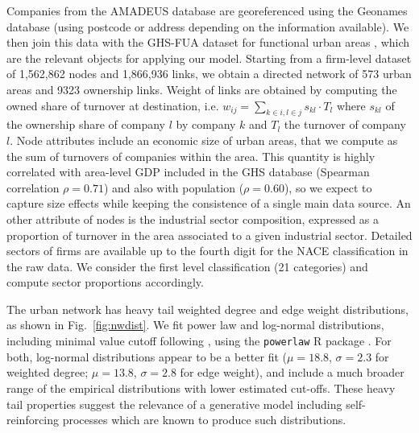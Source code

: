 \documentclass[11pt]{article}
\begin{document}

Companies from the AMADEUS database are georeferenced using the Geonames database (using postcode or address depending on the information available). We then join this data with the GHS-FUA dataset for functional urban areas \cite{Florczyk2019ghs}, which are the relevant objects for applying our model. Starting from a firm-level dataset of 1,562,862 nodes and  1,866,936 links, we obtain a directed network of 573 urban areas and 9323 ownership links. Weight of links are obtained by computing the owned share of turnover at destination, i.e. $w_{ij} = \sum_{k \in i,l \in j} s_{kl} \cdot T_l$ where $s_{kl}$ of the ownership share of company $l$ by company $k$ and $T_l$ the turnover of company $l$. Node attributes include an economic size of urban areas, that we compute as the sum of turnovers of companies within the area. This quantity is highly correlated with area-level GDP included in the GHS database (Spearman correlation $\rho = 0.71$) and also with population ($\rho = 0.60$), so we expect to capture size effects while keeping the consistence of a single main data source. An other attribute of nodes is the industrial sector composition, expressed as a proportion of turnover in the area associated to a given industrial sector. Detailed sectors of firms are available up to the fourth digit for the NACE classification in the raw data. We consider the first level classification (21 categories) and compute sector proportions accordingly.

The urban network has heavy tail weighted degree and edge weight distributions, as shown in Fig.~\ref{fig:nwdist}. We fit power law and log-normal distributions, including minimal value cutoff following \cite{clauset2009power}, using the \texttt{powerlaw} R package \cite{powerlawpackage}. For both, log-normal distributions appear to be a better fit ($\mu=18.8$, $\sigma=2.3$ for weighted degree; $\mu=13.8$, $\sigma=2.8$ for edge weight), and include a much broader range of the empirical distributions with lower estimated cut-offs. These heavy tail properties suggest the relevance of a generative model including self-reinforcing processes which are known to produce such distributions.
\end{document}
